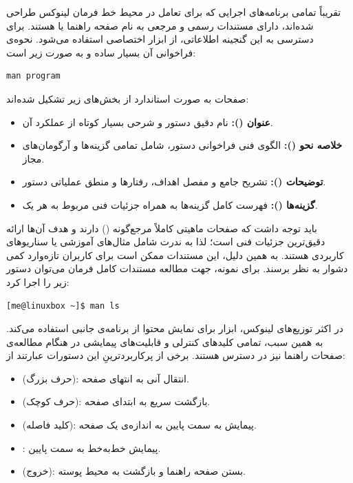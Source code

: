 تقریباً تمامی برنامه‌های اجرایی که برای تعامل در محیط خط فرمان لینوکس طراحی شده‌اند، دارای مستندات رسمی و مرجعی به نام صفحه راهنما یا  هستند. برای دسترسی به این گنجینه اطلاعاتی، از ابزار اختصاصی  استفاده می‌شود. نحوه‌ی فراخوانی آن بسیار ساده و به صورت زیر است:

\begin{latin}
\begin{lstlisting}
man program
\end{lstlisting}
\end{latin}

صفحات  به صورت استاندارد از بخش‌های زیر تشکیل شده‌اند:

\begin{itemize}
  \item \textbf{عنوان ():} نام دقیق دستور و شرحی بسیار کوتاه از عملکرد آن.
  \item \textbf{خلاصه نحو ():} الگوی فنی فراخوانی دستور، شامل تمامی گزینه‌ها و آرگومان‌های مجاز.
  \item \textbf{توضیحات ():} تشریح جامع و مفصل اهداف، رفتارها و منطق عملیاتی دستور.
  \item \textbf{گزینه‌ها ():} فهرست کامل گزینه‌ها به همراه جزئیات فنی مربوط به هر یک.
\end{itemize}

باید توجه داشت که صفحات  ماهیتی کاملاً مرجع‌گونه () دارند و هدف آن‌ها ارائه دقیق‌ترین جزئیات فنی است؛ لذا به ندرت شامل مثال‌های آموزشی یا سناریوهای کاربردی هستند. به همین دلیل، این مستندات ممکن است برای کاربران تازه‌وارد کمی دشوار به نظر برسند. برای نمونه، جهت مطالعه مستندات کامل فرمان  می‌توان دستور زیر را اجرا کرد:

\begin{latin}
\begin{lstlisting}
[me@linuxbox ~]$ man ls
\end{lstlisting}
\end{latin}

در اکثر توزیع‌های لینوکس، ابزار  برای نمایش محتوا از برنامه‌ی جانبی  استفاده می‌کند. به همین سبب، تمامی کلیدهای کنترلی و قابلیت‌های پیمایشی  در هنگام مطالعه‌ی صفحات راهنما نیز در دسترس هستند. برخی از پرکاربردترینِ این دستورات عبارتند از:

\begin{itemize}
  \item {} (حرف بزرگ): انتقال آنی به انتهای صفحه.
  \item {} (حرف کوچک): بازگشت سریع به ابتدای صفحه.
  \item {} (کلید فاصله): پیمایش به سمت پایین به اندازه‌ی یک صفحه.
  \item {}: پیمایش خط‌به‌خط به سمت پایین.
  \item {} (خروج): بستن صفحه راهنما و بازگشت به محیط پوسته.
\end{itemize}

